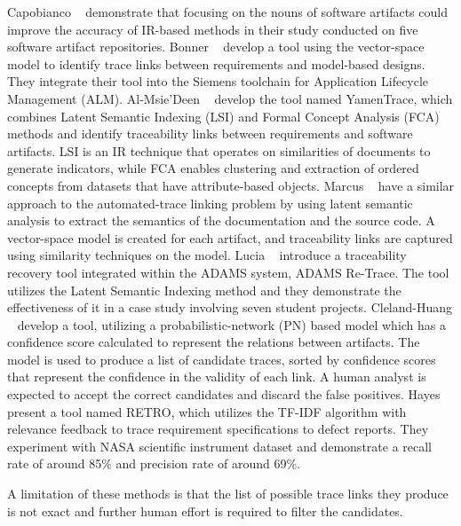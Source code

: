 Capobianco \etal{}~\cite{capobianco-2013} demonstrate that focusing on the nouns of software artifacts could improve the accuracy of IR-based methods in their study conducted on five software artifact repositories.
Bonner \etal{}~\cite{bonner-2023} develop a tool using the vector-space model to identify trace links between requirements and model-based designs. They  integrate their tool into the Siemens toolchain for Application Lifecycle Management (ALM).
Al-Msie'Deen \etal{}~\cite{deen-2023} develop the tool named YamenTrace, which combines Latent Semantic Indexing (LSI) and Formal Concept Analysis (FCA) methods and identify traceability links between requirements and software artifacts. LSI is an IR technique that operates on similarities of documents to generate indicators, while FCA enables clustering and extraction of ordered concepts from datasets that have attribute-based objects. 
Marcus \etal{}~\cite{marcus-2003} have a similar approach to the automated-trace linking problem by using latent semantic analysis to extract the semantics of the documentation and the source code. A vector-space model is created for each artifact, and traceability links are captured using similarity techniques on the model.
Lucia \etal{}~\cite{fasano-2005} introduce a traceability recovery tool integrated within the ADAMS system, ADAMS Re-Trace. The tool utilizes the Latent Semantic Indexing method and they demonstrate the effectiveness of it in a case study involving seven student projects.
Cleland-Huang \etal{}~\cite{cleland-huang-2007} develop a tool, utilizing a probabilistic-network (PN) based model which has a confidence score calculated to represent the relations between artifacts. The model is used to produce a list of candidate traces, sorted by confidence scores that represent the confidence in the validity of each link. A human analyst is expected to accept the correct candidates and discard the false positives. %
Hayes \etal{}~\cite{hayes-2005} present a tool named RETRO, which utilizes the TF-IDF algorithm with relevance feedback to trace requirement specifications to defect reports. They experiment with NASA scientific instrument dataset and demonstrate a recall rate of around 85\% and precision rate of around 69\%.


A limitation of these methods is that the list of possible trace links they produce is not exact and further human effort is required to filter the candidates.

